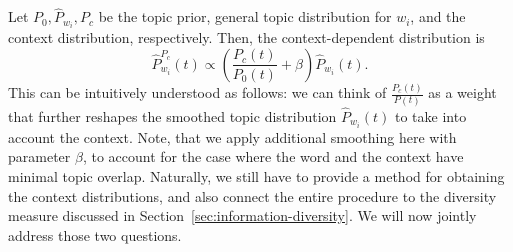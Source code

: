 \bed\label{context}
Let $P_0,\widehat{P}_{w_i}, P_c$ be the topic prior, general
topic distribution for $w_i$, and the context distribution,
respectively. Then, the context-dependent distribution is
\begin{equation*}
\widehat{P}^{P_c}_{w_i}(t)\propto \left(\frac{P_c(t)}{P_0(t)} + \beta\right)\widehat{P}_{w_i}(t).
\end{equation*}
\eed
This can be intuitively understood as follows:
we can think of $\frac{P_c(t)}{P(t)}$ as a weight
that further reshapes the smoothed topic distribution $\widehat{P}_{w_i}(t)$
to take into account the context. Note, that we apply additional
smoothing here with parameter $\beta$, to account for the case where
the word and the context have minimal topic overlap. Naturally, we still
have to provide a method for obtaining the context distributions, and
also connect the entire procedure to the diversity measure discussed in
Section~\ref{sec:information-diversity}. We will now jointly address
those two questions.



